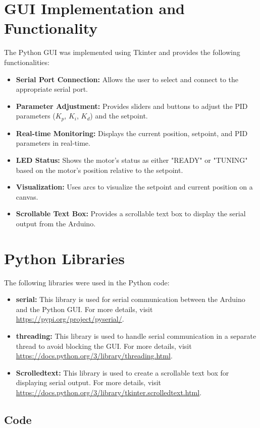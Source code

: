 \documentclass{article}
\begin{document}
\section{GUI Implementation and Functionality}
The Python GUI was implemented using Tkinter and provides the following functionalities:
\begin{itemize}
    \item \textbf{Serial Port Connection:} Allows the user to select and connect to the appropriate serial port.
    \item \textbf{Parameter Adjustment:} Provides sliders and buttons to adjust the PID parameters ($K_p$, $K_i$, $K_d$) and the setpoint.
    \item \textbf{Real-time Monitoring:} Displays the current position, setpoint, and PID parameters in real-time.
    \item \textbf{LED Status:} Shows the motor's status as either "READY" or "TUNING" based on the motor's position relative to the setpoint.
    \item \textbf{Visualization:} Uses arcs to visualize the setpoint and current position on a canvas.
    \item \textbf{Scrollable Text Box:} Provides a scrollable text box to display the serial output from the Arduino.
\end{itemize}


\section{Python Libraries}
The following libraries were used in the Python code:
\begin{itemize}
    \item \textbf{serial:} This library is used for serial communication between the Arduino and the Python GUI. For more details, visit \url{https://pypi.org/project/pyserial/}.
    \item \textbf{threading:} This library is used to handle serial communication in a separate thread to avoid blocking the GUI. For more details, visit \url{https://docs.python.org/3/library/threading.html}.
    \item \textbf{Scrolledtext:} This library is used to create a scrollable text box for displaying serial output. For more details, visit \url{https://docs.python.org/3/library/tkinter.scrolledtext.html}.
\end{itemize}

\subsection{Code}
\end{document}
